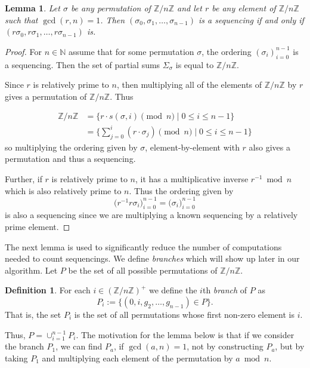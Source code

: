 \documentclass[12pt]{article}
\theoremstyle{plain}
\newtheorem{lemma}[theorem]{Lemma}
\theoremstyle{definition}
\newtheorem{definition}{Definition}
\theoremstyle{remark}
\newcommand{\ZZ}{\mathbb{Z}}
\newcommand{\NN}{\mathbb{N}}
\begin{document}
\begin{lemma}\label{lem:rel_prime_constructive} Let $\sigma$ be any permutation of $\ZZ / n\ZZ$ and let $r$ be any element of $\ZZ / n\ZZ$ such that $\gcd(r,n)=1$. Then $(\sigma_0,\sigma_1,\ldots,\sigma_{n-1})$ is a sequencing if and only if $(r\sigma_0, r\sigma_1,\ldots,r\sigma_{n-1})$ is.
\end{lemma}

\begin{proof}
For $n\in\NN$ assume that for some permutation $\sigma$, the ordering $(\sigma_i)_{i=0}^{n-1}$ is a sequencing. Then the set of partial sums $\Sigma_\sigma$
is equal to $\ZZ / n\ZZ$. 

Since $r$ is relatively prime to $n$, then multiplying all of the elements of $\ZZ / n\ZZ$ by $r$ gives a permutation of $\ZZ / n\ZZ$. Thus 

\begin{align*} \ZZ / n\ZZ &= \bigl\{r\cdot s(\sigma,i)\pmod{n}\mid 0\leq i \leq n-1\bigr\} \\ &=\Biggl\{\sum_{j=0}^i (r\cdot\sigma_j)\pmod{n}\mid 0\leq i \leq n-1\Biggr\} 
\end{align*}
so multiplying the ordering given by $\sigma$, element-by-element with $r$ also gives a permutation and thus a sequencing.

Further, if $r$ is relatively prime to $n$, it has a multiplicative inverse $r^{-1}\bmod{n}$ which is also relatively prime to $n$. Thus the ordering given by 
\[\bigl(r^{-1}r\sigma_i\bigr)_{i=0}^{n-1}=\bigl(\sigma_i\bigr)_{i=0}^{n-1}\]
is also a sequencing since we are multiplying a known sequencing by a relatively prime element.

\end{proof}

The next lemma is used to significantly reduce the number of computations needed to count sequencings. We define \textit{branches} which will show up later in our algorithm. Let $P$ be the set of all possible permutations of $\ZZ/n\ZZ$.



\begin{definition}\label{branches}
For each $i\in(\ZZ/n\ZZ)^+$ we define the $i$th \emph{branch} of $P$ as 
\[P_i:= \{(0,i,g_2,\ldots,g_{n-1})\in P \}.\]  
That is, the set $P_i$ is the set of all permutations whose first non-zero element is $i$.
\end{definition}

Thus,  $P=\cup_{i=1}^{n-1}P_i$. The motivation for the lemma below is that if we consider the branch $P_1$, we can find $P_a$, if $\gcd(a,n)=1$, not by constructing $P_a$, but by taking $P_1$ and multiplying each element of the permutation by $a\bmod{n}$.
\end{document}
